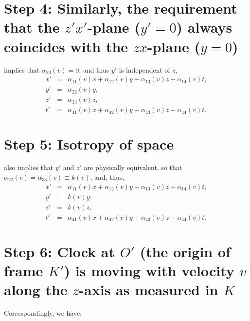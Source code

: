 \documentclass[twocolumn,preprintnumbers,amsmath,amssymb,final]{revtex4}
\def\BEqA{\begin{eqnarray}}
\def\EEqA{\end{eqnarray}}
\def\a{\alpha}
\begin{document}
\section*{Step 4: Similarly, the requirement that the 
$z'x'$-plane ($y'=0$) always coincides with the $zx$-plane ($y=0$)}

\noindent implies that $\a_{23}(v)=0$,
and thus $y'$ is independent of $z$,
\BEqA
x'&=&\a_{11}(v)x+\a_{12}(v)y+\a_{13}(v)z+\a_{14}(v)t,
\\
y'&=&\a_{22}(v)y,
\\
z'&=&\a_{33}(v)z,
\\
t'&=&\a_{41}(v)x+\a_{42}(v)y+\a_{43}(v)z+\a_{44}(v)t.
\EEqA


\section*{Step 5: Isotropy of space}
 
\noindent also implies that $y'$ and $z'$ are physically equivalent,
so that $\a_{22}(v)=\a_{33}(v) \equiv k(v)$, and, thus,
\BEqA
x'&=&\a_{11}(v)x+\a_{12}(v)y+\a_{13}(v)z+\a_{14}(v)t,
\\
y'&=&k(v)y,
\\
z'&=&k(v)z,
\\
t'&=&\a_{41}(v)x+\a_{42}(v)y+\a_{43}(v)z+\a_{44}(v)t.
\EEqA

\section*{Step 6: Clock at $O'$ (the origin of frame $K'$) is moving 
with velocity $v$ along the $z$-axis as measured in $K$}
 

\noindent Correspondingly, we have:
\end{document}
